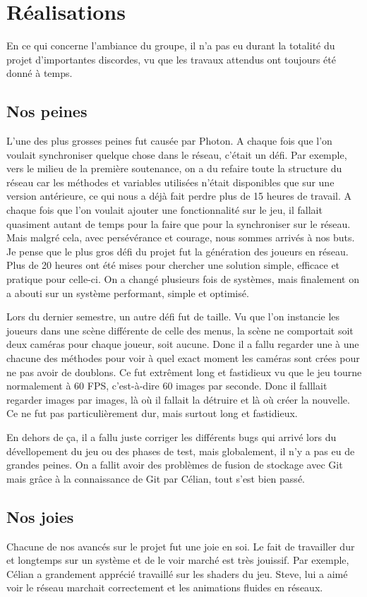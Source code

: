 \documentclass{article}
\begin{document}
\newpage
\section{Réalisations}
En ce qui concerne l'ambiance du groupe, il n'a pas eu durant la totalité du projet d'importantes discordes, vu que les travaux attendus ont toujours été donné à temps.

\subsection{Nos peines}
L'une des plus grosses peines fut causée par Photon. A chaque fois que l'on voulait synchroniser quelque chose dans le réseau, c'était un défi. Par exemple, vers le milieu de la première soutenance, on a du refaire toute la structure du réseau car les méthodes et variables utilisées n'était disponibles que sur une version antérieure, ce qui nous a déjà fait perdre plus de 15 heures de travail. A chaque fois que l'on voulait ajouter une fonctionnalité sur le jeu, il fallait quasiment autant de temps pour la faire que pour la synchroniser sur le réseau. Mais malgré cela, avec persévérance et courage, nous sommes arrivés à nos buts. Je pense que le plus gros défi du projet fut la génération des joueurs en réseau. Plus de 20 heures ont été mises pour chercher une solution simple, efficace et pratique pour celle-ci. On a changé plusieurs fois de systèmes, mais finalement on a abouti sur un système performant, simple et optimisé. 

Lors du dernier semestre, un autre défi fut de taille. Vu que l'on instancie les joueurs dans une scène différente de celle des menus, la scène ne comportait soit deux caméras pour chaque joueur, soit aucune. Donc il a fallu regarder une à une chacune des méthodes pour voir à quel exact moment les caméras sont crées pour ne pas avoir de doublons. Ce fut extrêment long et fastidieux vu que le jeu tourne normalement à 60 FPS, c'est-à-dire 60 images par seconde. Donc il falllait regarder images par images, là où il fallait la détruire et là où créer la nouvelle. Ce ne fut pas particulièrement dur, mais surtout long et fastidieux.

En dehors de ça, il a fallu juste corriger les différents bugs qui arrivé lors du dévellopement du jeu ou des phases de test, mais globalement, il n'y a pas eu de grandes peines. On a fallit avoir des problèmes de fusion de stockage avec Git mais grâce à la connaissance de Git par Célian, tout s'est bien passé.

\subsection{Nos joies}
Chacune de nos avancés sur le projet fut une joie en soi. Le fait de travailler dur et longtemps sur un système et de le voir marché est très jouissif. Par exemple, Célian a grandement apprécié travaillé sur les shaders du jeu. Steve, lui a aimé voir le réseau marchait correctement et les animations fluides en réseaux. 
\end{document}
